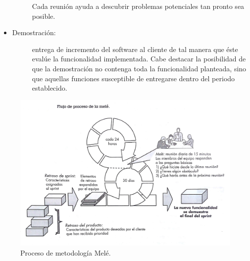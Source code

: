 \begin{itemize}
\begin{description}
			 	Cada reunión ayuda a descubrir problemas potenciales tan pronto sea posible.
			\end{description}

	\item 	\begin{description}
				\item[Demostración:] entrega de incremento del software al cliente de tal manera que éste evalúe la funcionalidad implementada. Cabe destacar la posibilidad de que la demostración no contenga toda la funcionalidad planteada, sino que aquellas funciones susceptible de entregarse dentro del periodo establecido.
			\end{description}
\end{itemize}

\begin{figure}[h!]
	\includegraphics[width=\textwidth]{Imagenes/mele.jpg}
	\caption{\label{fig: procesoMele} Proceso de metodología Melé.}
\end{figure}